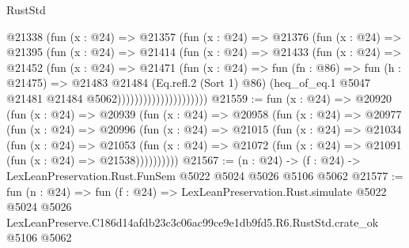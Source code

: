 \begin{lexlean}{RustStd}
\begin{coremodule}
                          @21338
                            (fun (x : @24) =>
                            @21357
                              (fun (x : @24) =>
                              @21376
                                (fun (x : @24) =>
                                @21395
                                  (fun (x : @24) =>
                                  @21414
                                    (fun (x : @24) =>
                                    @21433
                                      (fun (x : @24) =>
                                      @21452
                                        (fun (x : @24) =>
                                        @21471
                                          (fun (x : @24) =>
                                          fun (fn : @86) =>
                                          fun (h : @21475) =>
                                          @21483
                                            @21484
                                            (Eq.refl.{2} (Sort 1) @86)
                                            (heq_of_eq.{1}
                                              @5047
                                              @21481
                                              @21484
                                              @5062)))))))))))))))))))))
@21559 := fun (x : @24) =>
  @20920
    (fun (x : @24) =>
    @20939
      (fun (x : @24) =>
      @20958
        (fun (x : @24) =>
        @20977
          (fun (x : @24) =>
          @20996
            (fun (x : @24) =>
            @21015
              (fun (x : @24) =>
              @21034
                (fun (x : @24) =>
                @21053
                  (fun (x : @24) =>
                  @21072 (fun (x : @24) => @21091 (fun (x : @24) => @21538))))))))))
@21567 := (n : @24) -> (f : @24) -> LexLeanPreservation.Rust.FunSem @5022 @5024 @5026 @5106 @5062
@21577 := fun (n : @24) =>
  fun (f : @24) =>
  LexLeanPreservation.Rust.simulate
    @5022
    @5024
    @5026
    LexLeanPreserve.C186d14afdb23c3c06ac99ce9e1db9fd5.R6.RustStd.crate_ok
    @5106
    @5062
\end{coremodule}
\end{lexlean}

